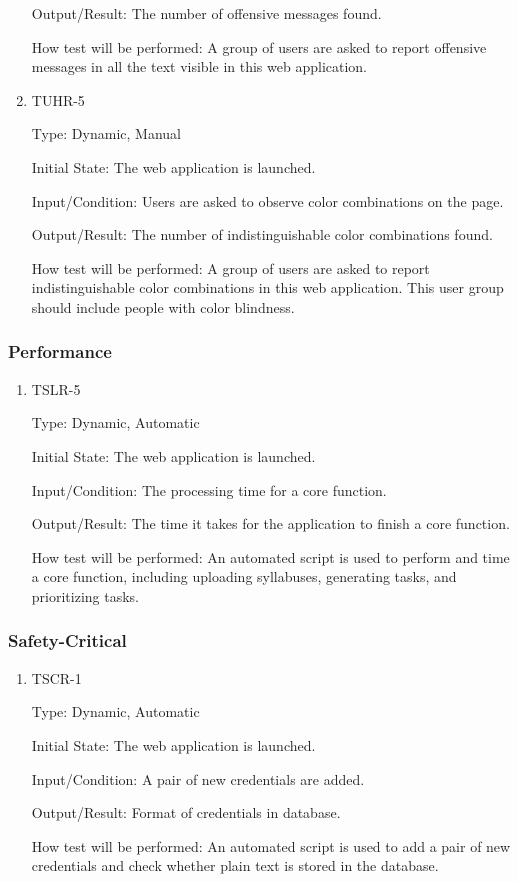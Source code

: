 \documentclass[12pt, titlepage]{article}
\begin{document}
\begin{enumerate}
Output/Result: The number of offensive messages found.
					
How test will be performed: A group of users are asked to report offensive messages in all the text visible in this web application.

\item{TUHR-5\\}

Type: Dynamic, Manual
					
Initial State: The web application is launched.
					
Input/Condition: Users are asked to observe color combinations on the page.
					
Output/Result: The number of indistinguishable color combinations found.
					
How test will be performed: A group of users are asked to report indistinguishable color combinations in this web application. This user group should include people with color blindness.


\end{enumerate}

\subsubsection{Performance}

\begin{enumerate}
\item{TSLR-5\\}

Type: Dynamic, Automatic
					
Initial State: The web application is launched.
					
Input/Condition: The processing time for a core function.
					
Output/Result: The time it takes for the application to finish a core function.
					
How test will be performed: An automated script is used to perform and time a core function, including uploading syllabuses, generating tasks, and prioritizing tasks.

\end{enumerate}
\subsubsection{Safety-Critical}

\begin{enumerate}
\item{TSCR-1\\}

Type: Dynamic, Automatic
					
Initial State: The web application is launched.
					
Input/Condition: A pair of new credentials are added.
					
Output/Result: Format of credentials in database.
					
How test will be performed: An automated script is used to add a pair of new credentials and check whether plain text is stored in the database.

\end{enumerate}
\end{document}

